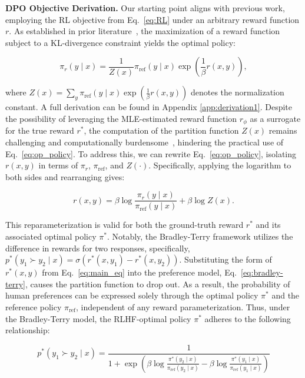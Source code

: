 \textbf{DPO Objective Derivation.} Our starting point aligns with previous work, employing the RL objective from Eq.~\ref{eq:RL} under an arbitrary reward function $r$. As established in prior literature~\citep{peters2007reinforcement, peng2019advantage, korbak2022reinforcement, go2023aligning}, the maximization of a reward function subject to a KL-divergence constraint yields the optimal policy:

\begin{equation}\label{eq:op_policy}
    \pi_r(y\mid x) = \frac{1}{Z(x)}\pi_\text{ref}(y\mid x)\exp\left(\frac{1}{\beta}r(x, y)\right),
\end{equation}

where $Z(x) =\sum_{y}\pi_\text{ref}(y\mid x)\exp\left(\frac{1}{\beta}r(x, y)\right)$ denotes the normalization constant. A full derivation can be found in Appendix \ref{app:derivation1}. Despite the possibility of leveraging the MLE-estimated reward function $r_{\phi}$ as a surrogate for the true reward $r^*$, the computation of the partition function $Z(x)$ remains challenging and computationally burdensome~\citep{korbak2022reinforcement, go2023aligning}, hindering the practical use of Eq.~\ref{eq:op_policy}. To address this, we can rewrite Eq.~\ref{eq:op_policy}, isolating $r(x, y)$ in terms of $\pi_r$, $\pi_\text{ref}$, and $Z(\cdot)$. Specifically, applying the logarithm to both sides and rearranging gives:

\begin{equation}\label{eq:main_eq}
    r(x,y) =\beta \log \frac{\pi_r(y\mid x)}{\pi_\text{ref}(y\mid x)} + \beta \log Z(x).
\end{equation}

This reparameterization is valid for both the ground-truth reward $r^*$ and its associated optimal policy $\pi^*$. Notably, the Bradley-Terry framework utilizes the difference in rewards for two responses, specifically, ${p^*(y_1 \succ y_2 \mid x) = \sigma(r^*(x, y_1) - r^*(x, y_2))}$. Substituting the form of $r^*(x, y)$ from Eq.~\ref{eq:main_eq} into the preference model, Eq.~\ref{eq:bradley-terry}, causes the partition function to drop out. As a result, the probability of human preferences can be expressed solely through the optimal policy $\pi^*$ and the reference policy $\pi_\text{ref}$, independent of any reward parameterization. Thus, under the Bradley-Terry model, the RLHF-optimal policy $\pi^*$ adheres to the following relationship:

\begin{equation}\label{eq:objective}
    p^*(y_1\succ y_2 \mid x)=\frac{1}{1 + \exp\left(\beta \log \frac{\pi^*(y_2\mid x)}{\pi_\text{ref}(y_2\mid x)} - \beta \log \frac{\pi^*(y_1\mid x)}{\pi_\text{ref}(y_1\mid x)}\right)}
\end{equation}


